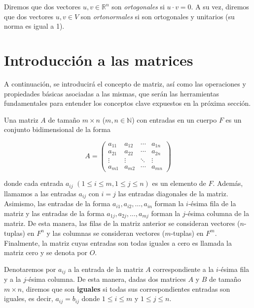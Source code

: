 \begin{definicion}
    Diremos que dos vectores $u, v \in \mathbb{R}^{n}$ son \emph{ortogonales} si $u \cdot v = 0$. A su vez, diremos que dos vectores $u, v \in V$ son \emph{ortonormales} si son ortogonales y unitarios (su norma es igual a 1).\newline
\end{definicion}

\section{Introducción a las matrices}\label{sec:intro-matrices}

A continuación, se introducirá el concepto de matriz, así como las operaciones y propiedades básicas asociadas a las mismas, que serán las herramientas fundamentales para entender los conceptos clave expuestos en la próxima sección.\newline

\begin{definicion}
    Una matriz $A$ de tamaño $m \times n$ ($m, n \in \mathbb{N}$) con entradas en un cuerpo $F$ es un conjunto bidimensional de la forma 
    
    \[ A =
        \begin{pmatrix} 
        a_{11} & a_{12} & \cdots & a_{1n} \\ 
        a_{21} & a_{22} & \cdots & a_{2n} \\ 
        \vdots & \vdots & \ddots & \vdots \\ 
        a_{m1} & a_{m2} & \cdots & a_{mn} 
        \end{pmatrix}
    \]

    donde cada entrada $a_{ij}$ $(1 \leq i \leq  m, 1 \leq j \leq n)$ es un elemento de $F$. Además, llamamos a las entradas $a_{ij}$ con $i=j$ las entradas diagonales de la matriz. Asimismo, las entradas de la forma $a_{i1}, a_{i2}, \ldots, a_{in}$ forman la $i$-ésima fila de la matriz y las entradas de la forma $a_{1j}, a_{2j}, \ldots, a_{mj}$ forman la $j$-ésima columna de la matriz. De esta manera, las filas de la matriz anterior se consideran vectores ($n$-tuplas) en $F^{n}$ y las columnas se consideran vectores ($m$-tuplas) en $F^{m}$. Finalmente, la matriz cuyas entradas son todas iguales a cero es llamada la matriz cero y se denota por $O$.\newline

\end{definicion}

\begin{definicion}
    Denotaremos por $a_{ij}$ a la entrada de la matriz $A$ correspondiente a la $i$-ésima fila y a la $j$-ésima columna. De esta manera, dadas dos matrices $A$ y $B$ de tamaño $m \times n$, diremos que son \textbf{iguales} si todas sus correspondientes entradas son iguales, es decir, $a_{ij} = b_{ij}$ donde $1 \leq i \leq m$ y $1 \leq j \leq n$.\newline 
\end{definicion}

